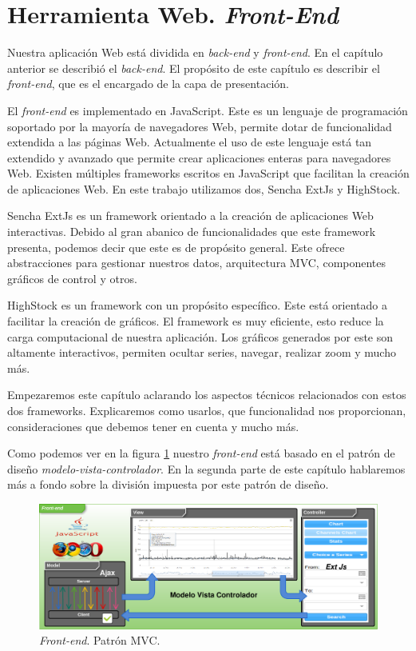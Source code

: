 \chapter{Herramienta Web. \emph{Front-End}}
\label{frontend}
Nuestra aplicación Web está dividida en \emph{back-end} y \emph{front-end}. En el capítulo anterior se describió el \emph{back-end}. El propósito de
este capítulo es describir el \emph{front-end}, que es el encargado de la capa de presentación.
\par
El \emph{front-end} es implementado en JavaScript\cite{JavaScript}. Este es un lenguaje de programación soportado por la mayoría de navegadores Web,
permite dotar de funcionalidad extendida a las páginas Web. Actualmente el uso de este lenguaje está tan extendido y avanzado que permite crear
aplicaciones enteras para navegadores Web. Existen múltiples frameworks escritos en JavaScript que facilitan la creación de aplicaciones Web. En este
trabajo utilizamos dos, Sencha ExtJs\cite{ExtJs} y HighStock\cite{HighStock}.
\par
Sencha ExtJs es un framework orientado a la creación de aplicaciones Web interactivas. Debido al gran abanico de funcionalidades que este framework
presenta, podemos decir que este es de propósito general. Este ofrece abstracciones para gestionar nuestros datos, arquitectura MVC, componentes
gráficos de control y otros.
\par
HighStock es un framework con un propósito específico. Este está orientado a facilitar la creación de gráficos. El framework es muy eficiente, esto
reduce la carga computacional de nuestra aplicación. Los gráficos generados por este son altamente interactivos, permiten ocultar series, navegar,
realizar zoom y mucho más.
\par
Empezaremos este capítulo aclarando los aspectos técnicos relacionados con estos dos frameworks. Explicaremos como usarlos, que funcionalidad nos
proporcionan, consideraciones que debemos tener en cuenta y mucho más.
\par
Como podemos ver en la figura \ref{frontend} nuestro \emph{front-end} está basado en el patrón de diseño
\emph{modelo-vista-controlador}\cite{MVCWiki}. En la segunda parte de este capítulo hablaremos más a fondo sobre la división impuesta por este patrón
de diseño.
\begin{figure}[h]
	\centering
	\includegraphics[keepaspectratio, width=1\textwidth]{./img/frontend.png}
	\caption{\emph{Front-end}. Patrón MVC.}   
	\label{fig:frontend}
\end{figure}
